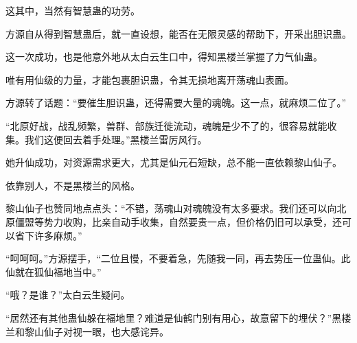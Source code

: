 \begin{this_body}
这其中，当然有智慧蛊的功劳。

方源自从得到智慧蛊后，就一直设想，能否在无限灵感的帮助下，开采出胆识蛊。

这一次成功，也是他意外地从太白云生口中，得知黑楼兰掌握了力气仙蛊。

唯有用仙级的力量，才能包裹胆识蛊，令其无损地离开荡魂山表面。

方源转了话题：“要催生胆识蛊，还得需要大量的魂魄。这一点，就麻烦二位了。”

“北原好战，战乱频繁，兽群、部族迁徙流动，魂魄是少不了的，很容易就能收集。我们这便回去着手处理。”黑楼兰雷厉风行。

她升仙成功，对资源需求更大，尤其是仙元石短缺，总不能一直依赖黎山仙子。

依靠别人，不是黑楼兰的风格。

黎山仙子也赞同地点点头：“不错，荡魂山对魂魄没有太多要求。我们还可以向北原僵盟等势力收购，比亲自动手收集，自然要贵一点，但价格仍旧可以承受，还可以省下许多麻烦。”

“呵呵呵。”方源摆手，“二位且慢，不要着急，先随我一同，再去势压一位蛊仙。此仙就在狐仙福地当中。”

“哦？是谁？”太白云生疑问。

“居然还有其他蛊仙躲在福地里？难道是仙鹤门别有用心，故意留下的埋伏？”黑楼兰和黎山仙子对视一眼，也大感诧异。

\end{this_body}

